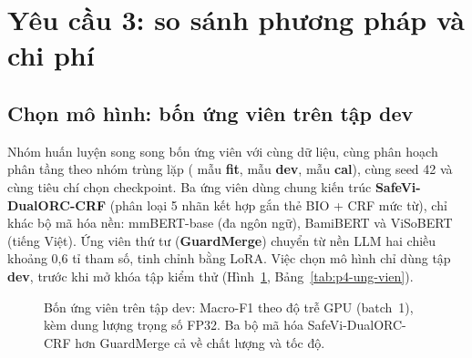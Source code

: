 
\section{Yêu cầu 3: so sánh phương pháp và chi phí}
\label{sec:yc3}

\subsection{Chọn mô hình: bốn ứng viên trên tập dev}
\label{sec:yc3-chon}

Nhóm huấn luyện song song bốn ứng viên với cùng dữ liệu, cùng phân hoạch phân tầng theo nhóm trùng lặp
( mẫu \textbf{fit},  mẫu \textbf{dev},  mẫu \textbf{cal}), cùng
seed 42 và cùng tiêu chí chọn checkpoint. Ba ứng viên dùng chung kiến trúc \textbf{SafeVi-DualORC-CRF}
(phân loại 5 nhãn kết hợp gắn thẻ BIO + CRF mức từ), chỉ khác bộ mã hóa nền: mmBERT-base (đa ngôn ngữ), BamiBERT và
ViSoBERT (tiếng Việt). Ứng viên thứ tư (\textbf{GuardMerge}) chuyển từ nền LLM hai chiều khoảng
0,6 tỉ tham số, tinh chỉnh bằng LoRA. Việc chọn mô hình chỉ dùng tập \textbf{dev},
trước khi mở khóa tập kiểm thử (Hình~\ref{fig:p4-ung-vien}, Bảng~\ref{tab:p4-ung-vien}).

\begin{figure}[H]
\centering

\caption{Bốn ứng viên trên tập dev: Macro-F1 theo độ trễ GPU (batch~1), kèm dung lượng trọng số FP32. Ba bộ mã hóa
SafeVi-DualORC-CRF hơn GuardMerge cả về chất lượng và tốc độ.}
\label{fig:p4-ung-vien}
\end{figure}


